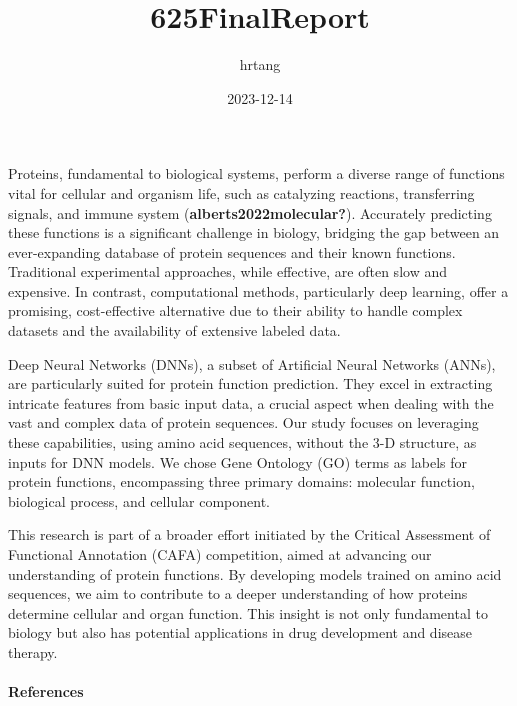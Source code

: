 \documentclass[
]{article}
\title{625FinalReport}
\author{hrtang}
\date{2023-12-14}
\begin{document}
\maketitle

Proteins, fundamental to biological systems, perform a diverse range of
functions vital for cellular and organism life, such as catalyzing
reactions, transferring signals, and immune system
(\textbf{alberts2022molecular?}). Accurately predicting these functions
is a significant challenge in biology, bridging the gap between an
ever-expanding database of protein sequences and their known functions.
Traditional experimental approaches, while effective, are often slow and
expensive. In contrast, computational methods, particularly deep
learning, offer a promising, cost-effective alternative due to their
ability to handle complex datasets and the availability of extensive
labeled data.

Deep Neural Networks (DNNs), a subset of Artificial Neural Networks
(ANNs), are particularly suited for protein function prediction. They
excel in extracting intricate features from basic input data, a crucial
aspect when dealing with the vast and complex data of protein sequences.
Our study focuses on leveraging these capabilities, using amino acid
sequences, without the 3-D structure, as inputs for DNN models. We chose
Gene Ontology (GO) terms as labels for protein functions, encompassing
three primary domains: molecular function, biological process, and
cellular component.

This research is part of a broader effort initiated by the Critical
Assessment of Functional Annotation (CAFA) competition, aimed at
advancing our understanding of protein functions. By developing models
trained on amino acid sequences, we aim to contribute to a deeper
understanding of how proteins determine cellular and organ function.
This insight is not only fundamental to biology but also has potential
applications in drug development and disease therapy.

\newpage

\hypertarget{references}{%
\paragraph{References}\label{references}}
\end{document}
